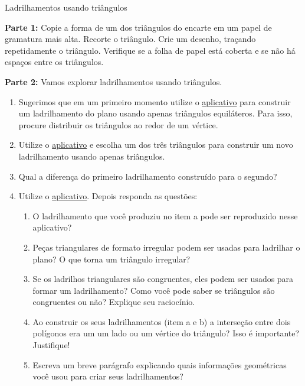 \begin{task}{Ladrilhamentos usando triângulos}\label{at_lad_tri}

\textbf{Parte 1:} Copie a forma de um dos triângulos do encarte em um papel de gramatura mais alta. Recorte o triângulo. Crie um desenho, traçando repetidamente o triângulo. Verifique se a folha de papel está coberta e se não há espaços entre os triângulos.

\textbf{Parte 2:} Vamos explorar  ladrilhamentos  usando triângulos. 
\begin{enumerate}

\item Sugerimos que em um primeiro momento utilize o  \href{https://www.geogebra.org/m/uuafzw8k}{aplicativo}  para construir um ladrilhamento do plano usando apenas triângulos equiláteros. Para isso, procure distribuir os triângulos ao redor de um vértice.

\item Utilize o  \href{https://www.geogebra.org/m/junvq3qd}{aplicativo} e escolha um dos três triângulos para construir um novo ladrilhamento usando apenas triângulos.
\item Qual a diferença do primeiro ladrilhamento construído para o segundo?
\item Utilize o  \href{https://www.geogebra.org/m/ejfw44rt}{aplicativo}. Depois responda as questões:
\begin{enumerate}
\item O ladrilhamento que você produziu no item a pode ser reproduzido nesse aplicativo?
\item 	Peças triangulares de formato irregular podem ser usadas para ladrilhar o plano? O que torna um triângulo irregular?
\item  Se os ladrilhos triangulares são congruentes, eles podem ser usados para formar um ladrilhamento? Como você pode saber se triângulos  são congruentes ou não? Explique seu raciocínio.
\item 	Ao construir os seus ladrilhamentos (item a e b) a interseção entre dois polígonos era um um lado ou um vértice do triângulo? Isso é importante? Justifique! 
\item Escreva um breve parágrafo explicando quais informações geométricas você usou para criar seus ladrilhamentos? 
\end{enumerate}
\end{enumerate}

\end{task}

